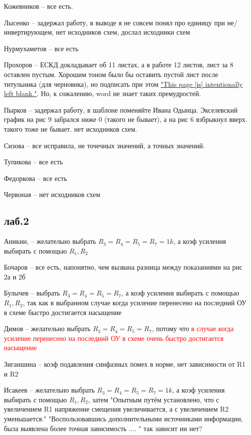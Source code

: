 \documentclass[a4paper,11pt]{article}
\begin{document}
Кожевников -- все есть.	  

Лысенко -- задержал работу, в выводе я не совсем понял про единицу при не/инвертирующем, нет исходников схем, дослал исходники схем

Нурмухаметов -- все есть

Прохоров -- ЕСКД докладывает об 11 листах, а в работе 12 листов, лист за 8 оставлен пустым. Хорошим тоном было бы оставить пустой лист после титульника (для черновика), но подписать при этом 
\href{https://en.wikipedia.org/wiki/Intentionally_blank_page}{"This page [is] intentionally left blank."}. Но, к сожалению, word не знает таких премудростей.

Пырков -- задержал работу, в шаблоне поменяйте Ивана Одынца. Экселевский график на рис 9 забрался ниже 0 (такого не бывает), а на рис 6 взбрыкнул вверх. такого тоже не бывает.
нет исходников схем.


Сизова -- все исправила, не точечных значений, а точных значений.

Тупикова  -- все есть

Федоркова -- все есть

Червоная -- нет исходников схем



\newpage
\subsection*{лаб.2}
Аникин,  --  желательно выбрать $R_3= R_4 = R_5 = R_7 = 1k$, а коэф усиления выбирать с помощью $R_1, R_2$

Бочаров -- все есть, напонятно, чем вызвана разница между показаниями на рис 2а и 2б

Булычев -- выбрать $R_3= R_4 = R_5 = R_7$, а коэф усиления выбирать с помощью $R_1, R_2$, так как в выбранном случае когда усиление перенесено на последний ОУ в схеме быстро достигается насыщение 

Димов --  желательно выбрать $R_3= R_4 = R_5 = R_7$, потому что \textcolor{red}{в случае когда усиление перенесено на последний ОУ в схеме очень быстро достигается 
насыщение}

Зиганшина -- коэф подавления синфазных помех в норме, нет зависимости от R1 и R2

Исакеев -- желательно выбрать $R_3= R_4 = R_5 = R_7 = 1k$, а коэф усиления выбирать с помощью $R_1, R_2$, 
затем "Опытным путём установлено, что с увеличением R1 напряжение смещения увеличивается, а с увеличением R2 уменьшается."
"Воспользовавшись дополнительными источниками информации, была выявлена
более точная зависимость .... " так зависит ии нет?
\end{document}

